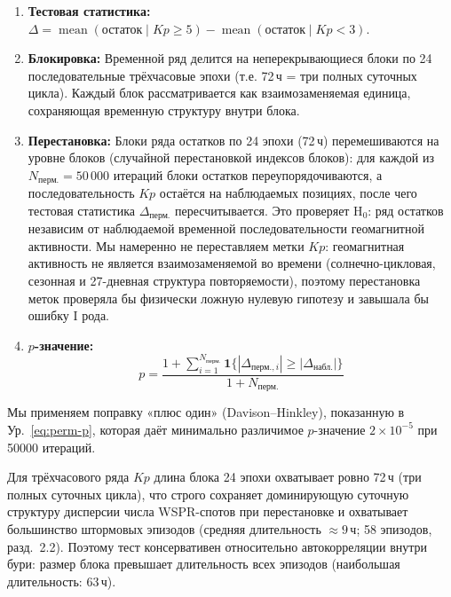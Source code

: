 \documentclass{agujournal2019}
\begin{document}
\begin{enumerate}
	\item \textbf{Тестовая статистика:}
	      $\Delta = \operatorname{mean}(\mbox{остаток} \mid Kp \ge 5)
		      - \operatorname{mean}(\mbox{остаток} \mid Kp < 3)$.
	\item \textbf{Блокировка:} Временной ряд делится на неперекрывающиеся
	      блоки по 24 последовательные трёхчасовые эпохи (т.е. 72\,ч = три
	      полных суточных цикла). Каждый блок рассматривается как
	      взаимозаменяемая единица, сохраняющая временную структуру внутри
	      блока.
	\item \textbf{Перестановка:} Блоки ряда остатков по 24 эпохи (72\,ч)
	      перемешиваются на уровне блоков (случайной перестановкой
	      индексов блоков): для каждой из $N_{\mbox{перм.}} = 50\,000$
	      итераций блоки остатков переупорядочиваются, а
	      последовательность $Kp$ остаётся на наблюдаемых позициях, после
	      чего тестовая статистика $\Delta_{\mbox{перм.}}$ пересчитывается.
	      Это проверяет H$_0$: ряд остатков независим от наблюдаемой
	      временной последовательности геомагнитной активности. Мы
	      намеренно не переставляем метки $Kp$: геомагнитная активность
	      не является взаимозаменяемой во времени (солнечно-цикловая,
	      сезонная и 27-дневная структура повторяемости), поэтому
	      перестановка меток проверяла бы физически ложную нулевую
	      гипотезу и завышала бы ошибку I рода.
	\item \textbf{$p$-значение:}
	      \begin{equation}
		      p = \frac{1 + \sum_{i=1}^{N_{\mbox{перм.}}}
			      \mathbf{1}\{ |\Delta_{\mbox{перм.}, i}| \ge |\Delta_{\mbox{набл.}}| \}}{1 + N_{\mbox{перм.}}}
		      \label{eq:perm-p}
	      \end{equation}
\end{enumerate}

Мы применяем поправку «плюс один» (Davison--Hinkley), показанную в
Ур.~\eqref{eq:perm-p}, которая даёт минимально различимое
$p$-значение $2 \times 10^{-5}$ при \num{50000} итераций.

Для трёхчасового ряда $Kp$ длина блока 24 эпохи охватывает ровно 72\,ч
(три полных суточных цикла), что строго сохраняет доминирующую суточную
структуру дисперсии числа WSPR-спотов при перестановке и охватывает
большинство штормовых эпизодов (средняя длительность $\approx 9$\,ч;
58 эпизодов, разд.~2.2). Поэтому тест консервативен относительно
автокорреляции внутри бури: размер блока превышает длительность всех
эпизодов (наибольшая длительность: 63\,ч).
\end{document}
